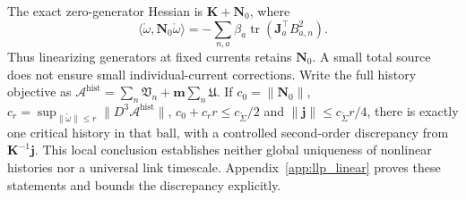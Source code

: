 The exact zero-generator Hessian is $\mathbf K+\mathbf N_0$, where
\begin{equation}
\langle\mathring\omega,\mathbf N_0\mathring\omega\rangle
=-\sum_{n,a}\beta_a\operatorname{tr}(\mathbf J_a^\top B_{a,n}^2).
\label{eq:latent_link_current_correction}
\end{equation}
Thus linearizing generators at fixed currents retains $\mathbf N_0$. A small total source
does not ensure small individual-current corrections. Write the full history objective as
$\mathcal A^{\mathrm{hist}}=\sum_n\mathfrak V_n+\mathbf m\sum_n\mathfrak U$.
If $c_0=\|\mathbf N_0\|$, $c_r=\sup_{\|\mathring\omega\|\leq r}\|D^3\mathcal A^{\mathrm{hist}}\|$,
$c_0+c_rr\leq c_{\mathring\Sigma}/2$ and $\|\mathbf j\|\leq c_{\mathring\Sigma}r/4$, there
is exactly one critical history in that ball, with a controlled second-order discrepancy
from $\mathbf K^{-1}\mathbf j$. This local conclusion establishes neither global uniqueness
of nonlinear histories nor a universal link timescale. Appendix~\ref{app:llp_linear} proves
these statements and bounds the discrepancy explicitly.